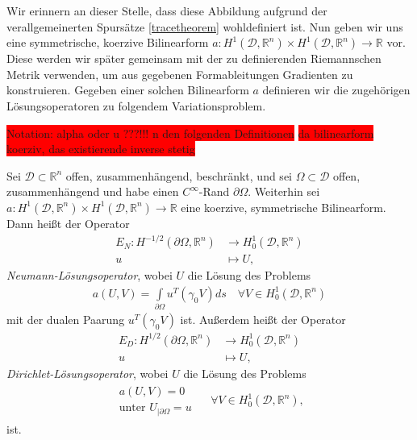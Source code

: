 Wir erinnern an dieser Stelle, dass diese Abbildung aufgrund der verallgemeinerten Spursätze \ref{tracetheorem} wohldefiniert ist. Nun geben wir uns eine symmetrische, koerzive Bilinearform $a: H^1(\mathcal{D}, \mathbb{R}^n)\times H^1(\mathcal{D}, \mathbb{R}^n) \rightarrow \mathbb{R}$ vor. Diese werden wir später gemeinsam mit der zu definierenden Riemannschen Metrik verwenden, um aus gegebenen Formableitungen Gradienten zu konstruieren. Gegeben einer solchen Bilinearform $a$ definieren wir die zugehörigen Lösungsoperatoren zu folgendem Variationsproblem.

\colorbox{red}{Notation: alpha oder u ???!!! n den folgenden Definitionen} \newline
\colorbox{red}{da bilinearform koerziv, das existierende inverse stetig}

\begin{defi}[Lösungsoperatoren]\label{Llsgsoperatoren}
Sei $\mathcal{D}\subset\mathbb{R}^n$ offen, zusammenhängend, beschränkt, und sei $\Omega\subset \mathcal{D}$ offen, zusammenhängend und habe einen $C^\infty$-Rand $\partial\Omega$.
Weiterhin sei $a: H^1(\mathcal{D}, \mathbb{R}^n)\times H^1(\mathcal{D}, \mathbb{R}^n) \rightarrow \mathbb{R}$ eine koerzive, symmetrische Bilinearform. Dann heißt der Operator 
\begin{align*}
	E_N: H^{-1/2}(\partial\Omega, \mathbb{R}^n) &\rightarrow H^{1}_0(\mathcal{D}, \mathbb{R}^n) \\
	u &\mapsto U,
\end{align*}
\textit{Neumann-Lösungsoperator}, wobei $U$ die Lösung des Problems
\begin{align*}
	a(U,V) = \underset{\partial\Omega}{\int}u^T(\gamma_0 V)ds \quad \forall V \in H^1_0(\mathcal{D},\mathbb{R}^n)
\end{align*}
mit der dualen Paarung $u^T(\gamma_0 V)$ ist. Außerdem heißt der Operator
\begin{align*}
	E_D: H^{1/2}(\partial\Omega, \mathbb{R}^n) &\rightarrow H^{1}_0(\mathcal{D}, \mathbb{R}^n) \\
	u &\mapsto U,
\end{align*}
\textit{Dirichlet-Lösungsoperator}, wobei $U$ die Lösung des Problems
\begin{align*}
	\begin{matrix} a(U,V) = 0 \\
	\text{unter } U_{\vert \partial\Omega} = u 
	\end{matrix} \quad\; \forall V \in H^1_0(\mathcal{D},\mathbb{R}^n),
\end{align*}
ist.
\end{defi}

